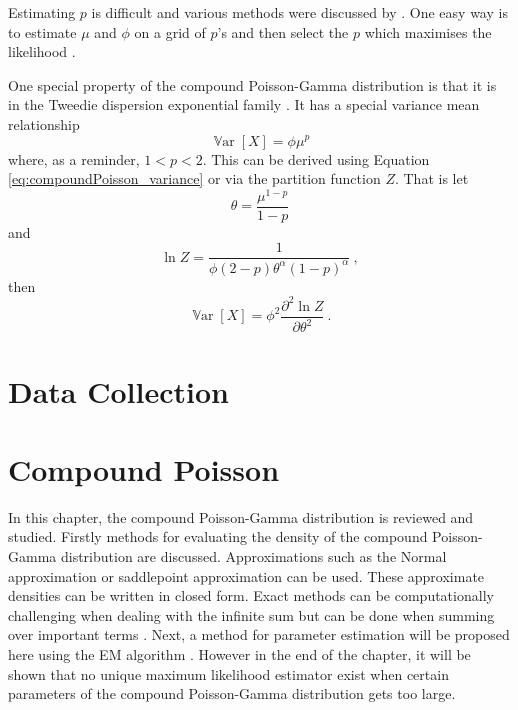 \documentclass[12pt, a4paper]{memoir}
\DeclareMathOperator{\variance}{\mathbb{V}ar}
\begin{document}
Estimating $p$ is difficult and various methods were discussed by \cite{zhang2013likelihood}. One easy way is to estimate $\mu$ and $\phi$ on a grid of $p$'s and then select the $p$ which maximises the likelihood \citep{dunn2005series}.

One special property of the compound Poisson-Gamma distribution is that it is in the Tweedie dispersion exponential family \citep{jorgensen1987exponential}. It has a special variance mean relationship
\begin{equation}
	\variance[X] = \phi \mu^p
\end{equation}
where, as a reminder, $1<p<2$. This can be derived using Equation \eqref{eq:compoundPoisson_variance} or via the partition function $Z$. That is let
\begin{equation}
	\theta = \frac{\mu^{1-p}}{1-p}
\end{equation}
and
\begin{equation}
	\ln Z = \frac{1}{\phi(2-p)\theta^\alpha(1-p)^\alpha} \ ,
\end{equation}
then
\begin{equation}
	\variance[X] = \phi^2 \frac{\partial^2\ln Z}{\partial\theta^2} \ .
\end{equation}

\chapter{Data Collection}

\chapter{Compound Poisson}
In this chapter, the compound Poisson-Gamma distribution is reviewed and studied. Firstly methods for evaluating the density of the compound Poisson-Gamma distribution are discussed. Approximations such as the Normal approximation or saddlepoint approximation \citep{daniels1954saddlepoint} can be used. These approximate densities can be written in closed form. Exact methods can be computationally challenging when dealing with the infinite sum but can be done when summing over important terms \citep{dunn2005series}. Next, a method for parameter estimation will be proposed here using the EM algorithm \citep{dempster1977maximum}. However in the end of the chapter, it will be shown that no unique maximum likelihood estimator exist when certain parameters of the compound Poisson-Gamma distribution gets too large.
\end{document}
